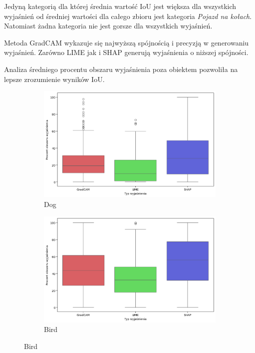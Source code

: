 Jedyną kategorią dla której średnia wartość IoU jest większa dla wszystkich wyjaśnień od średniej wartości dla całego zbioru jest kategoria \textit{Pojazd na kołach}.
Natomiast żadna kategoria nie jest gorsze dla wszystkich wyjaśnień.

Metoda GradCAM wykazuje się najwyższą spójnością i precyzją w generowaniu wyjaśnień.
Zarówno LIME jak i SHAP generują wyjaśnienia o niższej spójności.

\vspace{1cm}

Analiza średniego procentu obszaru wyjaśnienia poza obiektem pozwoliła na lepsze zrozumienie wyników IoU.

\begin{figure}[h]
	\centering
	\begin{subfigure}[b]{0.3\textwidth}
		\centering\includegraphics[width=.9\textwidth]{img/areaincorrect_dog}
		\caption{Dog}
	\end{subfigure}
	\begin{subfigure}[b]{0.3\textwidth}
		\centering\includegraphics[width=.9\textwidth]{img/areaincorrect_bird}
		\caption{Bird}
	\end{subfigure}

\end{figure}
